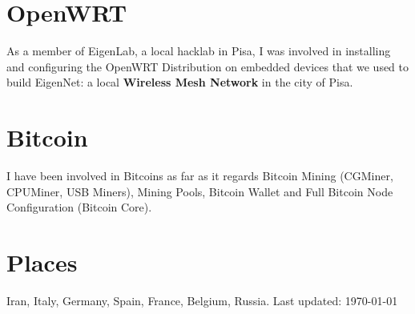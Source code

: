 \documentclass[]{friggeri-cv} %
\begin{document}
\begin{aside}\vspace{-2.75cm}
\section{OpenWRT \textcolor{green}{\faWifi}}
As a member of EigenLab, a local hacklab in Pisa, I was involved in installing and configuring the OpenWRT Distribution on embedded devices that we used to build EigenNet: a local \textbf{Wireless Mesh Network} in the city of Pisa.\vspace{6mm}
\section{Bitcoin \textcolor{red}{\faBitcoin}}
I have been involved in Bitcoins as far as it regards Bitcoin Mining (CGMiner, CPUMiner, USB Miners), Mining Pools, Bitcoin Wallet and Full Bitcoin Node Configuration (Bitcoin Core).\vspace{6mm}
\section{Places \textcolor{light-blue}{\faMapMarker}}
Iran, Italy, Germany, Spain, France, Belgium, Russia.\vspace{6mm}
\small{Last updated: \today\ }
\end{aside}

\end{document}
